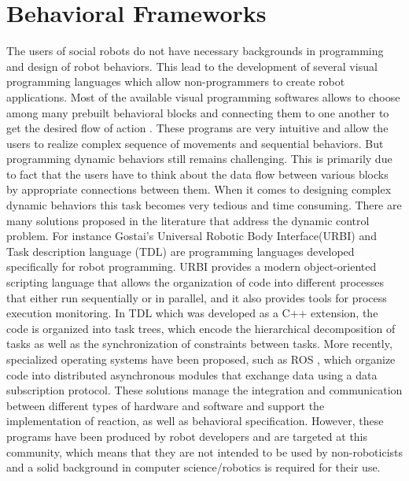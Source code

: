 \section{Behavioral Frameworks} %
The users of social robots do not have necessary backgrounds in programming and design of robot behaviors. This lead to the development of several visual programming languages which allow non-programmers to create robot applications. Most of the available visual programming softwares allows to choose among many prebuilt behavioral blocks and connecting them to one another to get the desired flow of action \cite{MSRS4} \cite{Choregraphe}. These programs are very intuitive and allow the users to realize complex sequence of movements and sequential behaviors. But programming dynamic behaviors still remains challenging. This is primarily due to fact that the users have to think about the data flow between various blocks by appropriate connections between them. When it comes to designing complex dynamic behaviors this task becomes very tedious and time consuming. There are many solutions proposed in the literature that address the dynamic control problem. For instance Gostai's Universal Robotic Body Interface(URBI) \cite{baillie2008urbi} and Task description language (TDL) \cite{simmons1998task} are programming languages developed specifically for robot programming. URBI provides a modern object-oriented scripting language that allows the organization of code into different processes that either run sequentially or in parallel, and it also provides tools for process execution monitoring. In TDL which was developed as a C++ extension, the code is organized into task trees, which encode the hierarchical decomposition of tasks as well as the synchronization of constraints between tasks. More recently, specialized operating systems have been proposed, such as ROS \cite{quigley2009ros}, which organize code into distributed asynchronous modules that exchange data using a data subscription protocol. These solutions manage the integration and communication between different types of hardware and software and support the implementation of reaction, as well as behavioral specification. However, these programs have been produced by robot developers and are targeted at this community, which means that they are not intended to be used by non-roboticists and a solid background in computer science/robotics is required for their use.
